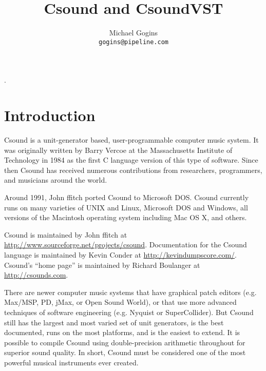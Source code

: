 \documentclass[10pt,letterpaper,onecolumn]{book}
\begin{document}
.

\title{Csound and CsoundVST}
\author{Michael Gogins \\ \texttt{gogins@pipeline.com}}
\maketitle


\section{Introduction}

Csound is a unit-generator based, user-programmable computer music system. It was originally written by Barry Vercoe at the Massachusetts Institute of Technology in 1984 as the first C language version of this type of software. Since then Csound has received numerous contributions from researchers, programmers, and musicians around the world. 

Around 1991, John ffitch ported Csound to Microsoft DOS. Csound currently runs on many varieties of UNIX and Linux, Microsoft DOS and Windows, all versions of the Macintosh operating system including Mac OS X, and others.

Csound is maintained by John ffitch at \url{http://www.sourceforge.net/projects/csound}. Documentation for the Csound language is maintained by Kevin Conder at \url{http://kevindumpscore.com/}. Csound's ``home page'' is maintained by Richard Boulanger at \url{http://csounds.com}. 

There are newer computer music systems that have graphical patch editors (e.g. Max/MSP, PD, jMax, or Open Sound World), or that use more advanced techniques of software engineering (e.g. Nyquist or SuperCollider). But Csound still has the largest and most varied set of unit generators, is the best documented, runs on the most platforms, and is the easiest to extend. It is possible to compile Csound using double-precision arithmetic throughout for superior sound quality. In short, Csound must be considered one of the most powerful musical instruments ever created.
\end{document}

